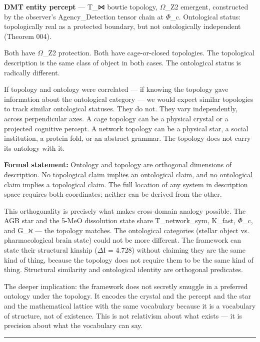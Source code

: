\documentclass[12pt,a4paper]{article}
\begin{document}
\textbf{DMT entity percept} --- T\_⋈ bowtie topology, $\Omega$\_Z2 emergent, constructed by the observer's Agency\_Detection tensor chain at $\Phi$\_c. Ontological status: topologically real as a protected boundary, but not ontologically independent (Theorem 004).

Both have $\Omega$\_Z2 protection. Both have cage-or-closed topologies. The topological description is the same class of object in both cases. The ontological status is radically different.

If topology and ontology were correlated --- if knowing the topology gave information about the ontological category --- we would expect similar topologies to track similar ontological statuses. They do not. They vary independently, across perpendicular axes. A cage topology can be a physical crystal or a projected cognitive percept. A network topology can be a physical star, a social institution, a protein fold, or an abstract grammar. The topology does not carry its ontology with it.

\textbf{Formal statement:} Ontology and topology are orthogonal dimensions of description. No topological claim implies an ontological claim, and no ontological claim implies a topological claim. The full location of any system in description space requires both coordinates; neither can be derived from the other.

This orthogonality is precisely what makes cross-domain analogy possible. The AGB star and the 5-MeO dissolution state share T\_network\_sym, K\_fast, $\Phi$\_c, and G\_ℵ --- the topology matches. The ontological categories (stellar object vs. pharmacological brain state) could not be more different. The framework can state their structural kinship ($\Delta$I = 4.728) without claiming they are the same kind of thing, because the topology does not require them to be the same kind of thing. Structural similarity and ontological identity are orthogonal predicates.

The deeper implication: the framework does not secretly smuggle in a preferred ontology under the topology. It encodes the crystal and the percept and the star and the mathematical lattice with the same vocabulary because it is a vocabulary of structure, not of existence. This is not relativism about what exists --- it is precision about what the vocabulary can say.

\begin{center}
\rule{0.5\textwidth}{0.4pt}
\end{center}
\end{document}
